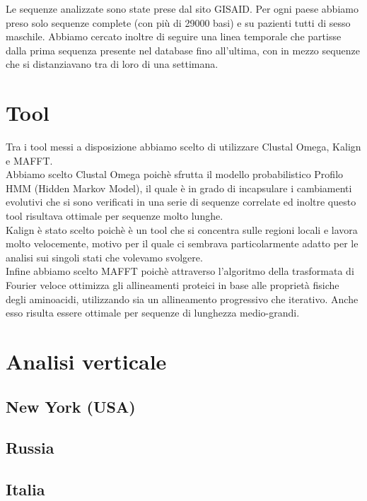 \documentclass[a4paper,10pt]{article}
\begin{document}
Le sequenze analizzate sono state prese dal sito GISAID. Per ogni paese abbiamo preso solo sequenze complete (con più di 29000 basi) e su pazienti tutti di sesso maschile. Abbiamo cercato inoltre di seguire una linea temporale che partisse dalla prima sequenza presente nel database fino all'ultima, con in mezzo sequenze che si distanziavano tra di loro di una settimana.

\section{Tool}
Tra i tool messi a disposizione abbiamo scelto di utilizzare Clustal Omega, Kalign e MAFFT.\\
Abbiamo scelto Clustal Omega poichè sfrutta il modello probabilistico Profilo HMM (Hidden Markov Model), il quale è in grado di incapsulare i cambiamenti evolutivi che si sono verificati in una serie di sequenze correlate ed inoltre questo tool risultava ottimale per sequenze molto lunghe.\\
Kalign è stato scelto poichè è un tool che si concentra sulle regioni locali e lavora molto velocemente, motivo per il quale ci sembrava particolarmente adatto per le analisi sui singoli stati che volevamo svolgere.\\
Infine abbiamo scelto MAFFT poichè attraverso l'algoritmo della trasformata di Fourier veloce ottimizza gli allineamenti proteici in base alle proprietà fisiche degli aminoacidi, utilizzando sia un allineamento progressivo che iterativo. Anche esso risulta essere ottimale per sequenze di lunghezza medio-grandi. %

\section{Analisi verticale}

\subsection{New York (USA)}

\subsection{Russia}

\subsection{Italia}
\end{document}
